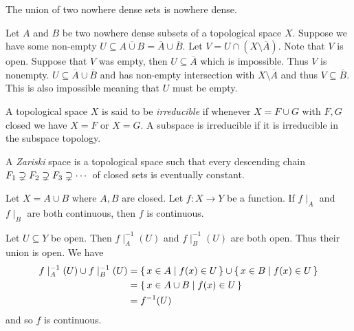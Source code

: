 \documentclass[letterpaper, 11pt, oneside]{book}
\begin{document}
\begin{exercise}
  The union of two nowhere dense sets is nowhere dense.
\end{exercise}
\begin{pf}
  Let $A$ and $B$ be two nowhere dense subsets of a topological space $X$.
  Suppose we have some non-empty $U \subseteq \overline{A \cup B} = \overline{A} \cup \overline{B}$.
  Let $V = U \cap (X \setminus \overline{A})$.
  Note that $V$ is open.
  Suppose that $V$ was empty, then $U \subseteq \overline{A}$ which is impossible.
  Thus $V$ is nonempty.
  $U \subseteq \overline{A} \cup \overline{B}$ and has non-empty intersection with $X \setminus \overline{A}$ and thus $V \subseteq \overline{B}$.
  This is also impossible meaning that $U$ must be empty.
\end{pf}

\clearpage

\begin{defn}
  A topological space $X$ is said to be \emph{irreducible} if whenever $X = F \cup G$ with $F, G$ closed we have $X = F$ or $X = G$.
  A subspace is irreducible if it is irreducible in the subspace topology.
\end{defn}

\begin{defn}
  A \emph{Zariski} space is a topological space such that every descending chain $F_{1} \supsetneq F_{2} \supsetneq F_{3} \supsetneq \cdots$ of closed sets is eventually constant.
\end{defn}

\begin{exercise}
  Let $X = A \cup B$ where $A, B$ are closed.
  Let $f\colon X \to Y$ be a function.
  If $f\mid_{A}$ and $f\mid_{B}$ are both continuous, then $f$ is continuous.
\end{exercise}
\begin{pf}
  Let $U \subseteq Y$ be open.
  Then $f\mid_{A}^{-1}(U)$ and $f\mid_{B}^{-1}(U)$ are both open.
  Thus their union is open.
  We have
  \begin{align*}
    f\mid_{A}^{-1}(U) \cup f\mid_{B}^{-1}(U) &= \set{x \in A | f(x) \in U} \cup \set{x \in B | f(x) \in U} \\
                                             &=  \set{x \in A \cup B | f(x) \in U} \\
    &= f^{-1}(U)
  \end{align*}
  and so $f$ is continuous.
\end{pf}
\end{document}
